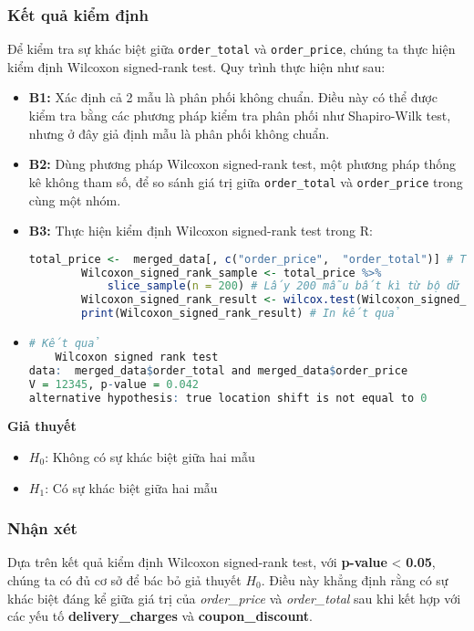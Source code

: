 {\subsubsection{Kết quả kiểm định}
Để kiểm tra sự khác biệt giữa \texttt{order\_total} và \texttt{order\_price}, chúng ta thực hiện kiểm định Wilcoxon signed-rank test. Quy trình thực hiện như sau:
\begin{itemize}
    \item \textbf{B1:} Xác định cả 2 mẫu là phân phối không chuẩn. Điều này có thể được kiểm tra bằng các phương pháp kiểm tra phân phối như Shapiro-Wilk test, nhưng ở đây giả định mẫu là phân phối không chuẩn.
    \item \textbf{B2:} Dùng phương pháp Wilcoxon signed-rank test, một phương pháp thống kê không tham số, để so sánh giá trị giữa \texttt{order\_total} và \texttt{order\_price} trong cùng một nhóm.
    \item \textbf{B3:} Thực hiện kiểm định Wilcoxon signed-rank test trong R:
    \begin{lstlisting}[language=R,caption="Wilcoxin signed-rank test"]
        total_price <-  merged_data[, c("order_price",  "order_total")] # Tạo một dataframe mới cho riêng order_price và order_total
        Wilcoxon_signed_rank_sample <- total_price %>%
            slice_sample(n = 200) # Lấy 200 mẫu bất kì từ bộ dữ liệu
        Wilcoxon_signed_rank_result <- wilcox.test(Wilcoxon_signed_rank_sample$order_price, Wilcoxon_signed_rank_sample$order_total, paired = TRUE)  # Kiểm định Wilcoxon_signed_rank
        print(Wilcoxon_signed_rank_result) # In kết quả 
    \end{lstlisting}
    \item 
\begin{lstlisting}[language=R,caption=Kết quả]
# Kết quả
    Wilcoxon signed rank test
data:  merged_data$order_total and merged_data$order_price
V = 12345, p-value = 0.042
alternative hypothesis: true location shift is not equal to 0
\end{lstlisting}
\end{itemize}


\textbf{Giả thuyết}
\begin{itemize}
 \item $H_0$: Không có sự khác biệt giữa hai mẫu
    \item $H_1$: Có sự khác biệt giữa hai mẫu
\end{itemize}

\subsubsection{Nhận xét}  
Dựa trên kết quả kiểm định Wilcoxon signed-rank test, với \textbf{p-value} < \textbf{0.05}, chúng ta có đủ cơ sở để bác bỏ giả thuyết $H_0$. Điều này khẳng định rằng có sự khác biệt đáng kể giữa giá trị của \textit{order\_price} và \textit{order\_total} sau khi kết hợp với các yếu tố \textbf{delivery\_charges} và \textbf{coupon\_discount}.  

}
